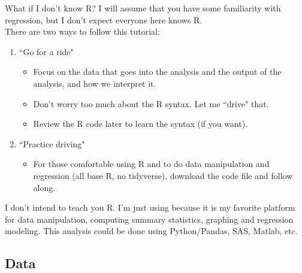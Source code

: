 \documentclass[10pt, aspectratio=169]{beamer}
\begin{document}
\begin{frame}{What if I don't know R?}
I will assume that you have some familiarity with regression, but I don't expect everyone here knows R.\\
\bigskip \pause
There are two ways to follow this tutorial: 
\begin{enumerate}
\pause 
\pause 
\item \alert{``Go for a ride"}
\begin{itemize}
\item Focus on the data that goes into the analysis and the output of the analysis, and how we interpret it. 
\item Don't worry too much about the R syntax. Let me ``drive" that. 
\item Review the R code later to learn the syntax (if you want).
\end{itemize}
\pause \item \alert{``Practice driving"}
\begin{itemize}
\item For those comfortable using R and to do data manipulation and regression (all base R, no tidyverse), download the code file and follow along. 
\end{itemize}
\end{enumerate}
\bigskip \pause
I don't intend to teach you R.  I'm just using because it is my favorite platform for data manipulation, computing summary statistics, graphing and regression modeling. This analysis could be done using Python/Pandas, SAS, Matlab, etc.
\end{frame}

\subsection{Data}
\end{document}
